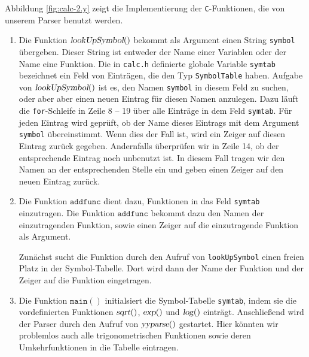 Abbildung \ref{fig:calc-2.y} zeigt die Implementierung der \texttt{C}-Funktionen, die von
unserem Parser benutzt werden.
\begin{enumerate}
\item Die Funktion $\textsl{lookUpSymbol}()$ bekommt als Argument einen String
      \texttt{symbol} \"ubergeben.  Dieser String ist entweder der Name einer Variablen oder der
      Name eine Funktion.  Die in \texttt{calc.h} definierte globale Variable \texttt{symtab}
      bezeichnet ein Feld von Eintr\"agen, die den Typ \texttt{SymbolTable} haben.  Aufgabe von
      $\textsl{lookUpSymbol}()$ ist es, den Namen \texttt{symbol} in diesem Feld
      zu suchen, oder aber aber einen neuen Eintrag f\"ur diesen Namen anzulegen.
      Dazu l\"auft die
      \texttt{for}-Schleife in Zeile 8 -- 19 \"uber alle Eintr\"age in dem Feld \texttt{symtab}.
      F\"ur jeden Eintrag wird gepr\"uft, ob der Name dieses Eintrags mit dem Argument
      \texttt{symbol} \"ubereinstimmt.  Wenn dies der Fall ist, wird ein Zeiger auf diesen
      Eintrag zur\"uck gegeben.  Andernfalls \"uberpr\"ufen wir in Zeile 14, ob der
      entsprechende Eintrag noch unbenutzt ist.  In diesem Fall tragen wir den Namen
      an der entsprechenden Stelle ein und geben einen Zeiger auf den neuen  Eintrag
      zur\"uck. 
\item Die Funktion $\mathtt{addfunc}$ dient dazu, Funktionen in das Feld \texttt{symtab}
      einzutragen.  Die Funktion $\mathtt{addfunc}$ bekommt dazu den Namen der
      einzutragenden Funktion, sowie einen Zeiger auf die einzutragende Funktion als Argument.

      Zun\"achst sucht die Funktion durch den Aufruf von \texttt{lookUpSymbol} einen freien
      Platz in der Symbol-Tabelle.  Dort wird dann 
      der Name der Funktion und der Zeiger auf die Funktion eingetragen.
\item Die Funktion $\mathtt{main}()$ initialsiert die Symbol-Tabelle \texttt{symtab},
      indem sie die vordefinierten Funktionen $\textsl{sqrt}()$, $\textsl{exp}()$ und
      $\textsl{log}()$ eintr\"agt.  Anschlie{\ss}end wird der Parser durch den Aufruf von 
      $\textsl{yyparse}()$ gestartet.  Hier k\"onnten wir problemlos auch alle
      trigonometrischen Funktionen sowie deren Umkehrfunktionen in die Tabelle eintragen.
\end{enumerate}

